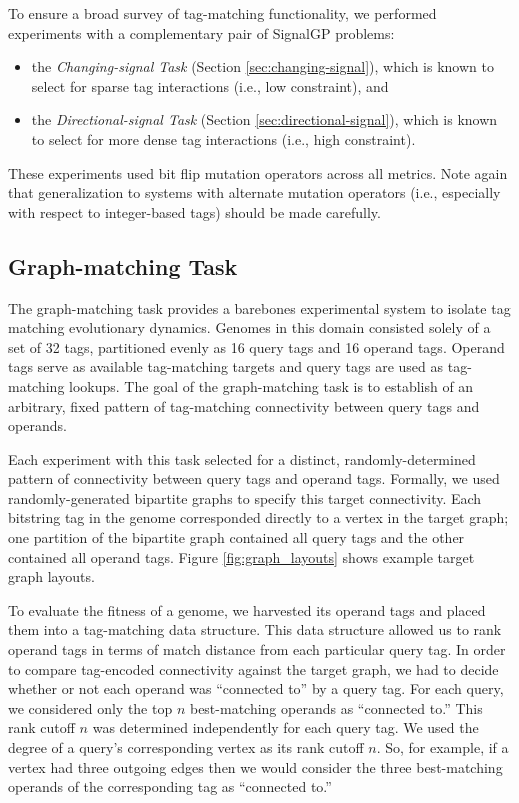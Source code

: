 To ensure a broad survey of tag-matching functionality, we performed experiments with a complementary pair of SignalGP problems:
\begin{itemize}
    \item the \textit{Changing-signal Task} (Section \ref{sec:changing-signal}), which is known to select for sparse tag interactions (i.e., low constraint), and
    \item the \textit{Directional-signal Task} (Section \ref{sec:directional-signal}), which is known to select for more dense tag interactions (i.e., high constraint).
\end{itemize}

These experiments used bit flip mutation operators across all metrics.
Note again that generalization to systems with alternate mutation operators (i.e., especially with respect to integer-based tags) should be made carefully.

\subsection{Graph-matching Task} \label{sec:graph-matching}






The graph-matching task provides a barebones experimental system to isolate tag matching evolutionary dynamics.
Genomes in this domain consisted solely of a set of 32 tags, partitioned evenly as 16 query tags and 16 operand tags.
Operand tags serve as available tag-matching targets and query tags are used as tag-matching lookups.
The goal of the graph-matching task is to establish of an arbitrary, fixed pattern of tag-matching connectivity between query tags and operands.

Each experiment with this task selected for a distinct, randomly-determined pattern of connectivity between query tags and operand tags.
Formally, we used randomly-generated bipartite graphs to specify this target connectivity.
Each bitstring tag in the genome corresponded directly to a vertex in the target graph;
one partition of the bipartite graph contained all query tags and the other contained all operand tags.
Figure \ref{fig:graph_layouts} shows example target graph layouts.

To evaluate the fitness of a genome, we harvested its operand tags and placed them into a tag-matching data structure.
This data structure allowed us to rank operand tags in terms of match distance from each particular query tag.
In order to compare tag-encoded connectivity against the target graph, we had to decide whether or not each operand was ``connected to'' by a query tag.
For each query, we considered only the top $n$ best-matching operands as ``connected to.''
This rank cutoff $n$ was determined independently for each query tag.
We used the degree of a query's corresponding vertex as its rank cutoff $n$.
So, for example, if a vertex had three outgoing edges then we would consider the three best-matching operands of the corresponding tag as ``connected to.''

